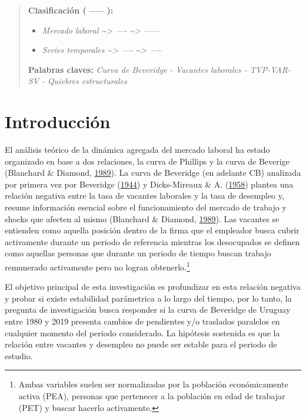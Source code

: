 \documentclass[12pt,oneside]{reedthesis}
\providecommand{\tightlist}{%
  \setlength{\itemsep}{0pt}\setlength{\parskip}{0pt}}
\begin{document}
\begin{abstract}
    \textbf{Clasificación ( ----- ):}
    \begin{itemize}
    \tightlist
    \item
      \emph{Mercado laboral \textasciitilde{}\textgreater{} ---- \textasciitilde{}\textgreater{} ------}
    \item
      \emph{Series temporales \textasciitilde{}\textgreater{} ---- \textasciitilde{}\textgreater{} ----}
    \end{itemize}
    \textbf{Palabras claves:} \emph{Curva de Beveridge - Vacantes laborales - TVP-VAR-SV - Quiebres estructurales}
  \end{abstract}

  \hypersetup{linkcolor=black}
  \setcounter{tocdepth}{2}
  \tableofcontents

  \listoftables

  \listoffigures

\mainmatter %
\pagestyle{fancyplain} %

\hypertarget{intro}{%
\chapter{Introducción}\label{intro}}

El análisis teórico de la dinámica agregada del mercado laboral ha estado organizado en base a dos relaciones, la curva de Phillips y la curva de Beverige (Blanchard \& Diamond, \protect\hyperlink{ref-Blanchard1989}{1989}). La curva de Beveridge (en adelante CB) analizada por primera vez por Beveridge (\protect\hyperlink{ref-Beveridge}{1944}) y Dicks-Mireaux \& A. (\protect\hyperlink{ref-Dicks-Mireaux1958}{1958}) plantea una relación negativa entre la tasa de vacantes laborales y la tasa de desempleo y, resume información esencial sobre el funcionamiento del mercado de trabajo y shocks que afecten al mismo (Blanchard \& Diamond, \protect\hyperlink{ref-Blanchard1989}{1989}). Las vacantes se entienden como aquella posición dentro de la firma que el empleador busca cubrir activamente durante un periodo de referencia mientras los desocupados se definen como aquellas personas que durante un periodo de tiempo buscan trabajo remunerado activamente pero no logran obtenerlo.\footnote{Ambas variables suelen ser normalizadas por la población económicamente activa (PEA), personas que pertenecer a la población en edad de trabajar (PET) y buscar hacerlo activamente.}

El objetivo principal de esta investigación es profundizar en esta relación negativa y probar si existe estabilidad parámetrica a lo largo del tiempo, por lo tanto, la pregunta de investigación busca responder si la curva de Beveridge de Uruguay entre 1980 y 2019 presenta cambios de pendientes y/o traslados paralelos en cualquier momento del periodo considerado. La hipótesis sostenida es que la relación entre vacantes y desempleo no puede ser estable para el periodo de estudio.
\end{document}
